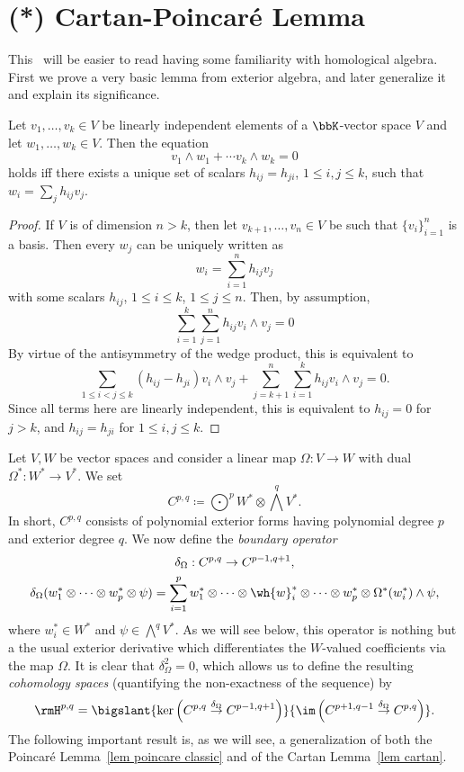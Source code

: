 \section{(*) Cartan-Poincar\'e Lemma}


This \sect\ will be easier to read having some familiarity with homological algebra. First we prove a very basic lemma from exterior algebra, and later generalize it and explain its significance.


\begin{lem}[Cartan]\label{lem cartan}
    Let $v_1,\ldots,v_k\in V$ be linearly independent elements of a $\bbK$-vector space $V$ and let $w_1,\ldots,w_k\in V$. Then the equation
    \[v_1\wedge w_1+\cdots v_k\wedge w_k=0\]
    holds iff there exists a unique set of scalars $h_{ij}=h_{ji}$, $1\leq i,j\leq k$, such that $w_i=\sum_j h_{ij}v_j$.
\end{lem}
\begin{proof}
    If $V$ is of dimension $n>k$, then let $v_{k+1},\ldots,v_n\in V$ be such that $\{v_i\}_{i=1}^n$ is a basis. Then every $w_j$ can be uniquely written as 
    \[w_i=\sum_{i=1}^n h_{ij}v_j\]
    with some scalars $h_{ij}$, $1\leq i\leq k$, $1\leq j\leq n$. Then, by assumption,
    \[\sum_{i=1}^k\sum_{j=1}^n h_{ij}v_i\wedge v_j=0\]
    By virtue of the antisymmetry of the wedge product, this is equivalent to
    \[\sum_{1\leq i<j\leq k}(h_{ij}-h_{ji})v_i\wedge v_j+\sum_{j=k+1}^n\sum_{i=1}^k h_{ij}v_i\wedge v_j=0.\]
    Since all terms here are linearly independent, this is equivalent to $h_{ij}=0$ for $j>k$, and $h_{ij}=h_{ji}$ for $1\leq i,j\leq k$.
\end{proof}


Let $V,W$ be vector spaces and consider a linear map $\Omega:V\to W$ with dual $\Omega^\ast:W^\ast\to V^\ast$. We set 
\[C^{p,q}\coloneqq \bigodot^p W^\ast\otimes \bigwedge^q V^\ast.\]
In short, $C^{p,q}$ consists of polynomial exterior forms having polynomial degree $p$ and exterior degree $q$. We now define the \emph{boundary operator}
\begin{gather}
    \delta_\Omega:C^{p,q}\to C^{p-1,q+1},\\
    \delta_\Omega(w_1^\ast\otimes\cdots\otimes w_p^\ast\otimes \psi)=\sum_{i=1}^p w_1^\ast\otimes\cdots\otimes \wh{w}_i^\ast\otimes\cdots\otimes w_p^\ast \otimes \Omega^\ast(w_i^\ast)\wedge\psi,
\end{gather}
where $w_i^\ast\in W^\ast$ and $\psi\in \bigwedge^q V^\ast$. As we will see below, this operator is nothing but a the usual exterior derivative which differentiates the $W$-valued coefficients via the map $\Omega$. It is clear that $\delta_\Omega^2=0$, which allows us to define the resulting \emph{cohomology spaces} (quantifying the non-exactness of the sequence) by 
\[\rmH^{p,q}=\bigslant{\ker\left(C^{p,q}\overset{\delta_\Omega}{\to}C^{p-1,q+1}\right)}{\im \left(C^{p+1,q-1}\overset{\delta_\Omega}{\to}C^{p,q}\right)}.\]
The following important result is, as we will see, a generalization of both the Poincar\'e Lemma~\ref{lem poincare classic} and of the Cartan Lemma~\ref{lem cartan}.

